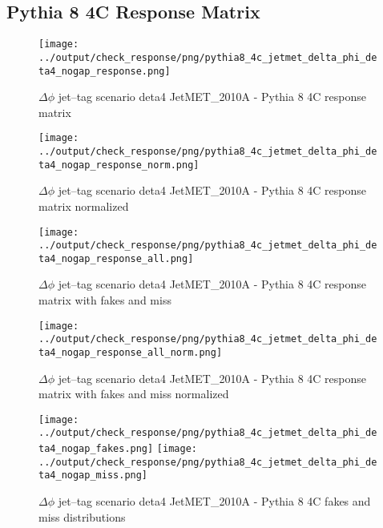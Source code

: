 \documentclass[11pt]{book}
\begin{document}
\clearpage
\subsection{Pythia 8 4C Response Matrix}


\begin{figure}[ht]
\centering
\texttt{[image: ../output/check\_response/png/pythia8\_4c\_jetmet\_delta\_phi\_deta4\_nogap\_response.png]}
\caption{$\Delta\phi$ jet--tag scenario deta4 JetMET\_2010A - Pythia 8 4C response matrix}
\label{p8_jetmet_delta_phi_deta4_nogap_response}
\end{figure}

\begin{figure}[ht]
\centering
\texttt{[image: ../output/check\_response/png/pythia8\_4c\_jetmet\_delta\_phi\_deta4\_nogap\_response\_norm.png]}
\caption{$\Delta\phi$ jet--tag scenario deta4 JetMET\_2010A - Pythia 8 4C response matrix normalized}
\label{p8_jetmet_delta_phi_deta4_nogap_response_norm}
\end{figure}

\begin{figure}[ht]
\centering
\texttt{[image: ../output/check\_response/png/pythia8\_4c\_jetmet\_delta\_phi\_deta4\_nogap\_response\_all.png]}
\caption{$\Delta\phi$ jet--tag scenario deta4 JetMET\_2010A - Pythia 8 4C response matrix with fakes and miss}
\label{p8_jetmet_delta_phi_deta4_nogap_response_all}
\end{figure}

\begin{figure}[ht]
\centering
\texttt{[image: ../output/check\_response/png/pythia8\_4c\_jetmet\_delta\_phi\_deta4\_nogap\_response\_all\_norm.png]}
\caption{$\Delta\phi$ jet--tag scenario deta4 JetMET\_2010A - Pythia 8 4C response matrix with fakes and miss normalized}
\label{p8_jetmet_delta_phi_deta4_nogap_response_all_norm}
\end{figure}

\begin{figure}[ht]
\centering
\texttt{[image: ../output/check\_response/png/pythia8\_4c\_jetmet\_delta\_phi\_deta4\_nogap\_fakes.png]}
\texttt{[image: ../output/check\_response/png/pythia8\_4c\_jetmet\_delta\_phi\_deta4\_nogap\_miss.png]}
\caption{$\Delta\phi$ jet--tag scenario deta4 JetMET\_2010A - Pythia 8 4C fakes and miss distributions}
\label{p8_jetmet_delta_phi_deta4_nogap_fakesmiss}
\end{figure}


\clearpage
\end{document}
